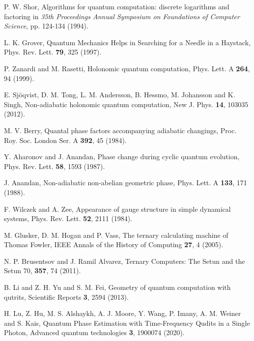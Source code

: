 {\footnotesize
\begin{enumerate}[label={[\arabic*]}]
\item P. W. Shor, Algorithms for quantum computation: discrete logarithms and factoring in \textit{35th Proceedings Annual Symposium on Foundations of Computer Science}, pp. 124-134 (1994).

\item L. K. Grover, Quantum Mechanics Helps in Searching for a Needle in a Haystack, Phys. Rev. Lett. \textbf{79}, 325 (1997).

\item P. Zanardi and M. Rasetti, Holonomic quantum computation, Phys. Lett. A \textbf{264}, 94 (1999).

\item E. Sjöqvist, D. M. Tong, L. M. Andersson, B. Hessmo, M. Johansson and K. Singh, Non-adiabatic holonomic quantum computation, New J. Phys. \textbf{14}, 103035 (2012).

\item M. V. Berry, Quantal phase factors accompanying adiabatic changings, Proc. Roy. Soc. London Ser. A \textbf{392}, 45 (1984).

\item Y. Aharonov and J. Anandan, Phase change during cyclic quantum evolution, Phys. Rev. Lett. \textbf{58}, 1593 (1987).

\item J. Anandan, Non-adiabatic non-abelian geometric phase, Phys. Lett. A \textbf{133}, 171 (1988).

\item F. Wilczek and A. Zee, Appearance of gauge structure in simple dynamical systems, Phys. Rev. Lett. \textbf{52}, 2111 (1984).

\item M. Glusker, D. M. Hogan and P. Vass, The ternary calculating machine of Thomas Fowler, IEEE Annals of the History of Computing \textbf{27}, 4 (2005).

\item N. P. Brusentsov and J. Ramil Alvarez, Ternary Computers: The Setun and the Setun 70, \textbf{357}, 74 (2011).

\item B. Li and Z. H. Yu and S. M. Fei, Geometry of quantum computation with qutrits, Scientific Reports \textbf{3}, 2594 (2013).

\item H. Lu, Z. Hu, M. S. Alshaykh, A. J. Moore, Y. Wang, P. Imany, A. M. Weiner and S. Kais, Quantum Phase Estimation with Time‐Frequency Qudits in a Single Photon, Advanced quantum technologies \textbf{3}, 1900074 (2020).


\end{enumerate}}
